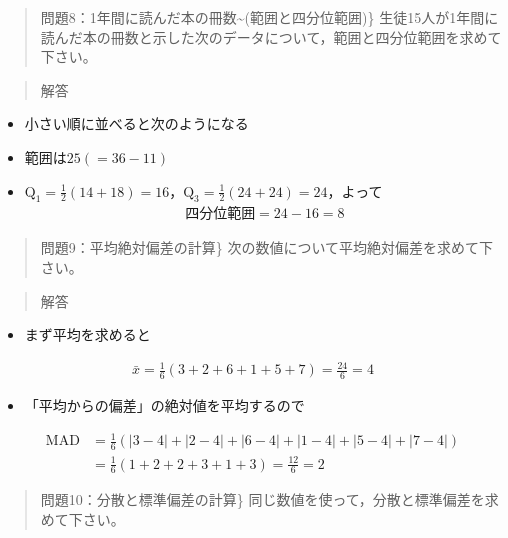 \documentclass[
]{book}
\providecommand{\tightlist}{%
  \setlength{\itemsep}{0pt}\setlength{\parskip}{0pt}}
\theoremstyle{definition}
\theoremstyle{definition}
\theoremstyle{definition}
\theoremstyle{definition}
\theoremstyle{remark}
\begin{document}
\begin{quote}
問題8：1年間に読んだ本の冊数\textasciitilde(範囲と四分位範囲)\}
生徒15人が1年間に読んだ本の冊数と示した次のデータについて，範囲と四分位範囲を求めて下さい。
\end{quote}

\begin{quote}
解答
\end{quote}

\begin{itemize}
\tightlist
\item
  小さい順に並べると次のようになる
\end{itemize}

\begin{itemize}
\tightlist
\item
  範囲は\(25(=36-11)\)
\item
  \(\text{Q}_1=\frac{1}{2}(14+18)=16\)，\(\text{Q}_3=\frac{1}{2}(24+24)=24\)，よって
  \begin{align*}
  \text{四分位範囲}=24-16=8
  \end{align*}
\end{itemize}

\begin{quote}
問題9：平均絶対偏差の計算\}
次の数値について平均絶対偏差を求めて下さい。
\end{quote}

\begin{quote}
解答
\end{quote}

\begin{itemize}
\tightlist
\item
  まず平均を求めると
\end{itemize}

\begin{align*}
\bar{x}=\frac{1}{6}(3+2+6+1+5+7)=\frac{24}{6}=4
\end{align*}

\begin{itemize}
\tightlist
\item
  「平均からの偏差」の絶対値を平均するので
\end{itemize}

\begin{align*}
\text{MAD}
&=\frac{1}{6}(|3-4|+|2-4|+|6-4|+|1-4|+|5-4|+|7-4|) \\
&=\frac{1}{6}(1+2+2+3+1+3)=\frac{12}{6}=2
\end{align*}

\begin{quote}
問題10：分散と標準偏差の計算\}
同じ数値を使って，分散と標準偏差を求めて下さい。
\end{quote}
\end{document}
